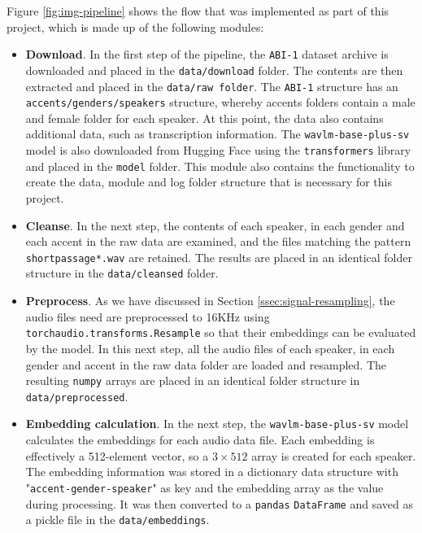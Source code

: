 \documentclass[conference]{IEEEtran}
\begin{document}
Figure \ref{fig:img-pipeline} shows the flow that was implemented as part of this project, which is made up of the following modules:
\begin{itemize}
	\item \textbf{Download}. In the first step of the pipeline, the \texttt{ABI-1} dataset archive is downloaded and placed in the \texttt{data/download} folder. The contents are then extracted and placed in the \texttt{data/raw folder}. The \texttt{ABI-1} structure has an \texttt{accents/genders/speakers} structure, whereby accents folders contain a male and female folder for each speaker. At this point, the data also contains additional data, such as transcription information.
	The \texttt{wavlm-base-plus-sv} model is also downloaded from Hugging Face using the \texttt{transformers} library and placed in the \texttt{model} folder.
	This module also contains the functionality to create the data, module and log folder structure that is necessary for this project.
	
	\item \textbf{Cleanse}. In the next step, the contents of each speaker, in each gender and each accent in the raw data are examined, and the files matching the pattern \texttt{shortpassage*.wav} are retained. The results are placed in an identical folder structure in the \texttt{data/cleansed} folder.
	
	\item \textbf{Preprocess}. As we have discussed in Section \ref{ssec:signal-resampling}, the audio files need are preprocessed to 16KHz using \texttt{torchaudio.transforms.Resample} so that their embeddings can be evaluated by the model. In this next step, all the audio files of each speaker, in each gender and accent in the raw data folder are loaded and resampled. The resulting \texttt{numpy} arrays are placed in an identical folder structure in \texttt{data/preprocessed}.
	
	\item \textbf{Embedding calculation}. In the next step, the \texttt{wavlm-base-plus-sv} model calculates the embeddings for each audio data file. Each embedding is effectively a 512-element vector, so a $3 \times 512$ array is created for each speaker. The embedding information was stored in a dictionary data structure with "\texttt{accent-gender-speaker}" as key and the embedding array as the value during processing. It was then converted to a \texttt{pandas} \texttt{DataFrame} and saved as a pickle file in the \texttt{data/embeddings}.
	

\end{itemize}
\end{document}

